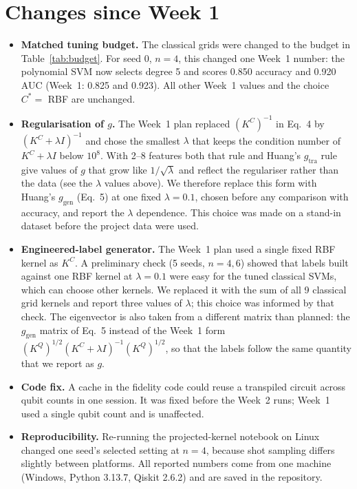 \documentclass[conference]{IEEEtran}
\begin{document}
\section{Changes since Week 1}\label{sec:changes}
\begin{itemize}
\item \textbf{Matched tuning budget.} The classical grids were changed to the budget in Table~\ref{tab:budget}. For seed 0, $n=4$, this changed one Week~1 number: the polynomial SVM now selects degree 5 and scores 0.850 accuracy and 0.920 AUC (Week~1: 0.825 and 0.923). All other Week~1 values and the choice $C^\ast=$ RBF are unchanged.
\item \textbf{Regularisation of $g$.} The Week~1 plan replaced $(K^C)^{-1}$ in Eq.~4 by $(K^C+\lambda I)^{-1}$ and chose the smallest $\lambda$ that keeps the condition number of $K^C+\lambda I$ below $10^8$. With 2--8 features both that rule and Huang's $g_{\mathrm{tra}}$ rule give values of $g$ that grow like $1/\sqrt{\lambda}$ and reflect the regulariser rather than the data (see the $\lambda$ values above). We therefore replace this form with Huang's $g_{\mathrm{gen}}$ (Eq.~5) at one fixed $\lambda=0.1$, chosen before any comparison with accuracy, and report the $\lambda$ dependence. This choice was made on a stand-in dataset before the project data were used.
\item \textbf{Engineered-label generator.} The Week~1 plan used a single fixed RBF kernel as $K^C$. A preliminary check (5 seeds, $n=4,6$) showed that labels built against one RBF kernel at $\lambda=0.1$ were easy for the tuned classical SVMs, which can choose other kernels. We replaced it with the sum of all 9 classical grid kernels and report three values of $\lambda$; this choice was informed by that check. The eigenvector is also taken from a different matrix than planned: the $g_{\mathrm{gen}}$ matrix of Eq.~5 instead of the Week~1 form $(K^{Q})^{1/2}(K^{C}+\lambda I)^{-1}(K^{Q})^{1/2}$, so that the labels follow the same quantity that we report as $g$.
\item \textbf{Code fix.} A cache in the fidelity code could reuse a transpiled circuit across qubit counts in one session. It was fixed before the Week~2 runs; Week~1 used a single qubit count and is unaffected.
\item \textbf{Reproducibility.} Re-running the projected-kernel notebook on Linux changed one seed's selected setting at $n=4$, because shot sampling differs slightly between platforms. All reported numbers come from one machine (Windows, Python 3.13.7, Qiskit 2.6.2) and are saved in the repository.
\end{itemize}
\end{document}

